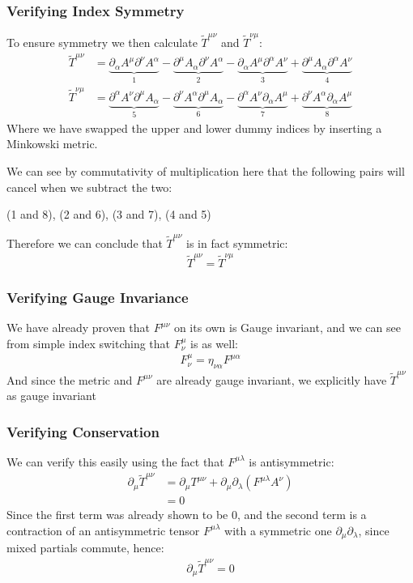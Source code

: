 \documentclass[12pt]{article}
\newcommand{\D}{\partial}
\begin{document}
\subsubsection{Verifying Index Symmetry}
To ensure symmetry we then calculate $\tilde{T}^{\mu\nu}$ and $\tilde{T}^{\nu\mu}$:
\begin{align*}
  \tilde{T}^{\mu\nu}&=
  \underbrace{\D_\alpha A^\mu\D^\nu A^\alpha}_1
  -\underbrace{\D^\mu A_\alpha\D^\nu A^\alpha}_2
  -\underbrace{\D_\alpha A^\mu\D^\alpha A^\nu}_3
  +\underbrace{\D^\mu A_\alpha\D^\alpha A^\nu}_4\\
  \tilde{T}^{\nu\mu}&=
  \underbrace{\D^\alpha A^\nu\D^\mu A_\alpha}_5
  -\underbrace{\D^\nu A^\alpha\D^\mu A_\alpha}_6
  -\underbrace{\D^\alpha A^\nu\D_\alpha A^\mu}_7
  +\underbrace{\D^\nu A^\alpha\D_\alpha A^\mu}_8
\end{align*}
Where we have swapped the upper and lower dummy indices by inserting a Minkowski metric.

We can see by commutativity of multiplication here that the following pairs will cancel when we subtract the two:
\begin{center}
 (1 and 8), (2 and 6), (3 and 7), (4 and 5)
\end{center}
Therefore we can conclude that $\tilde{T}^{\mu\nu}$ is in fact symmetric:
\begin{align}
  \boxed{\tilde{T}^{\mu\nu}=\tilde{T}^{\nu\mu}}
\end{align}

\subsubsection{Verifying Gauge Invariance}
We have already proven that $F^{\mu\nu}$ on its own is Gauge invariant, and we can see from simple index switching that $F^\mu_\nu$ is as well:
\begin{align*}
  F^\mu_\nu=\eta_{\nu\alpha}F^{\mu\alpha}
\end{align*}
And since the metric and $F^{\mu\nu}$ are already gauge invariant, we explicitly have $\tilde{T}^{\mu\nu}$ as gauge invariant

\subsubsection{Verifying Conservation}
We can verify this easily using the fact that $F^{\mu\lambda}$ is antisymmetric:
\begin{align*}
  \D_\mu\tilde{T}^{\mu\nu}&=\D_\mu T^{\mu\nu}+
  \D_\mu\D_\lambda(F^{\mu\lambda}A^\nu)\\
  &=0
\end{align*}
Since the first term was already shown to be 0, and the second term is a contraction of an antisymmetric tensor $F^{\mu\lambda}$ with a symmetric one $\D_\mu\D_\lambda$, since mixed partials commute, hence:
\begin{align}
  \boxed{\D_\mu\tilde{T}^{\mu\nu}=0}
\end{align}
\end{document}
